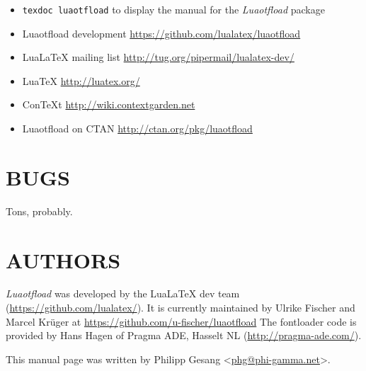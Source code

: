 \documentclass[a4paper]{article}
\begin{document}
\begin{itemize}
\item \texttt{texdoc luaotfload} to display the manual for the \emph{Luaotfload}
package

\item Luaotfload development \url{https://github.com/lualatex/luaotfload}

\item LuaLaTeX mailing list  \url{http://tug.org/pipermail/lualatex-dev/}

\item LuaTeX                 \url{http://luatex.org/}

\item ConTeXt                \url{http://wiki.contextgarden.net}

\item Luaotfload on CTAN     \url{http://ctan.org/pkg/luaotfload}
\end{itemize}


\section{BUGS%
  \label{bugs}%
}

Tons, probably.


\section{AUTHORS%
  \label{authors}%
}

\emph{Luaotfload} was developed by the LuaLaTeX dev team
(\url{https://github.com/lualatex/}). It is currently maintained by Ulrike Fischer
and Marcel Krüger at \url{https://github.com/u-fischer/luaotfload}
The fontloader code is provided by Hans Hagen of Pragma ADE, Hasselt
NL (\url{http://pragma-ade.com/}).

This manual page was written by Philipp Gesang <\href{mailto:phg@phi-gamma.net}{phg@phi-gamma.net}>.
\end{document}
